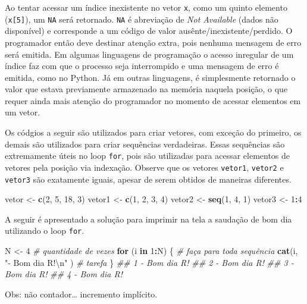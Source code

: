 \documentclass[
  11pt,
  a5paper,
  openany]{book}
\newenvironment{Shaded}{\begin{snugshade}}{\end{snugshade}}
\newcommand{\CharTok}[1]{\textcolor[rgb]{0.31,0.60,0.02}{#1}}
\newcommand{\CommentTok}[1]{\textcolor[rgb]{0.56,0.35,0.01}{\textit{#1}}}
\newcommand{\ControlFlowTok}[1]{\textcolor[rgb]{0.13,0.29,0.53}{\textbf{#1}}}
\newcommand{\DecValTok}[1]{\textcolor[rgb]{0.00,0.00,0.81}{#1}}
\newcommand{\KeywordTok}[1]{\textcolor[rgb]{0.13,0.29,0.53}{\textbf{#1}}}
\newcommand{\NormalTok}[1]{#1}
\newcommand{\OperatorTok}[1]{\textcolor[rgb]{0.81,0.36,0.00}{\textbf{#1}}}
\newcommand{\StringTok}[1]{\textcolor[rgb]{0.31,0.60,0.02}{#1}}
\begin{document}
Ao tentar acessar um índice inexistente no vetor \texttt{x}, como um quinto elemento (\texttt{x{[}5{]}}), um \texttt{NA} será retornado. \texttt{NA} é abreviação de \emph{Not Available} (dados não disponível) e corresponde a um código de valor ausênte/inexistente/perdido. O programador então deve destinar atenção extra, pois nenhuma mensagem de erro será emitida. Em algumas linguagens de programação o acesso inregular de um índice faz com que o processo seja interrompido e uma mensagem de erro é emitida, como no Python. Já em outras linguagens, é simplesmente retornado o valor que estava previamente armazenado na memória naquela posição, o que requer ainda mais atenção do programador no momento de acessar elementos em um vetor.

Os códgios a seguir são utilizados para criar vetores, com exceção do primeiro, os demais são utilizados para criar sequências verdadeiras. Essas sequências são extremamente úteis no loop \texttt{for}, pois são utilizadas para acessar elementos de vetores pela posição via indexação. Observe que os vetores \texttt{vetor1}, \texttt{vetor2} e \texttt{vetor3} são exatamente iguais, apesar de serem obtidos de maneiras diferentes.

\begin{Shaded}
\begin{Highlighting}[]
\NormalTok{vetor <-}\StringTok{ }\KeywordTok{c}\NormalTok{(}\DecValTok{2}\NormalTok{, }\DecValTok{5}\NormalTok{, }\DecValTok{18}\NormalTok{, }\DecValTok{3}\NormalTok{)}
\NormalTok{vetor1 <-}\StringTok{ }\KeywordTok{c}\NormalTok{(}\DecValTok{1}\NormalTok{, }\DecValTok{2}\NormalTok{, }\DecValTok{3}\NormalTok{, }\DecValTok{4}\NormalTok{)}
\NormalTok{vetor2 <-}\StringTok{ }\KeywordTok{seq}\NormalTok{(}\DecValTok{1}\NormalTok{, }\DecValTok{4}\NormalTok{, }\DecValTok{1}\NormalTok{)}
\NormalTok{vetor3 <-}\StringTok{ }\DecValTok{1}\OperatorTok{:}\DecValTok{4}
\end{Highlighting}
\end{Shaded}

A seguir é apresentado a solução para imprimir na tela a saudação de bom dia utilizando o loop \texttt{for}.

\begin{Shaded}
\begin{Highlighting}[]
\NormalTok{N <-}\StringTok{ }\DecValTok{4} \CommentTok{# quantidade de vezes}
\ControlFlowTok{for}\NormalTok{ (i }\ControlFlowTok{in} \DecValTok{1}\OperatorTok{:}\NormalTok{N) \{ }\CommentTok{# faça para toda sequência}
    \KeywordTok{cat}\NormalTok{(i, }\StringTok{"- Bom dia R!}\CharTok{\textbackslash{}n}\StringTok{"}\NormalTok{ ) }\CommentTok{# tarefa}
\NormalTok{\}}
\CommentTok{## 1 - Bom dia R!}
\CommentTok{## 2 - Bom dia R!}
\CommentTok{## 3 - Bom dia R!}
\CommentTok{## 4 - Bom dia R!}
\end{Highlighting}
\end{Shaded}

Obs: não contador\ldots{} incremento implícito.

  
\end{document}
